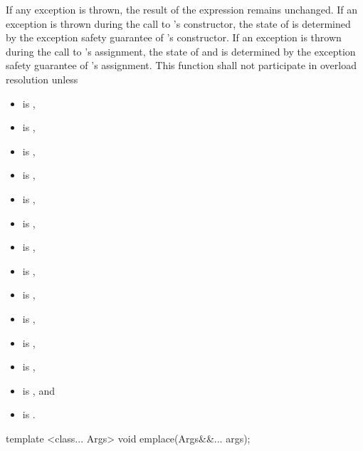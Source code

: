 \begin{itemdescr}
\pnum
\remarks
If any exception is thrown,
the result of the expression  remains unchanged.
If an exception is thrown during the call to 's constructor,
the state of  is determined by
the exception safety guarantee of 's constructor.
If an exception is thrown during the call to 's assignment,
the state of  and  is determined by
the exception safety guarantee of 's assignment.
This function shall not participate in overload resolution unless
\begin{itemize}
\item {} is ,
\item {} is ,
\item {} is ,
\item {} is ,
\item {} is ,
\item {} is ,
\item {} is ,
\item {} is ,
\item {} is ,
\item {} is ,
\item {} is ,
\item {} is ,
\item {} is , and
\item {} is .
\end{itemize}
\end{itemdescr}

%
\begin{itemdecl}
template <class... Args> void emplace(Args&&... args);
\end{itemdecl}


